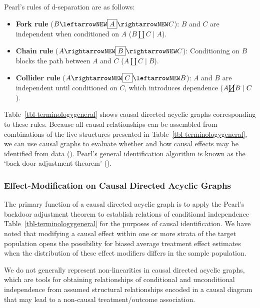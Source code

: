\documentclass[
  single column]{article}
\providecommand{\tightlist}{%
  \setlength{\itemsep}{0pt}\setlength{\parskip}{0pt}}\usepackage{longtable,booktabs,array}
\begin{document}
Pearl's rules of d-separation are as follows:

\begin{itemize}
\tightlist
\item
  \textbf{Fork rule} (\(B \leftarrowNEW \boxed{A} \rightarrowNEW C\)):
  \(B\) and \(C\) are independent when conditioned on \(A\)
  (\(B \coprod C \mid A\)).
\item
  \textbf{Chain rule} (\(A \rightarrowNEW \boxed{B} \rightarrowNEW C\)):
  Conditioning on \(B\) blocks the path between \(A\) and \(C\)
  (\(A \coprod C \mid B\)).
\item
  \textbf{Collider rule}
  (\(A \rightarrowNEW \boxed{C} \leftarrowNEW B\)): \(A\) and \(B\) are
  independent until conditioned on \(C\), which introduces dependence
  (\(A \cancel{\coprod} B \mid C\)).
\end{itemize}

Table~\ref{tbl-terminologygeneral} shows causal directed acyclic graphs
corresponding to these rules. Because all causal relationships can be
assembled from combinations of the five structures presented in
Table~\ref{tbl-terminologygeneral}, we can use causal graphs to evaluate
whether and how causal effects may be identified from data
(). Pearl's general
identification algorithm is known as the `back door adjustment theorem'
().

\subsubsection{Effect-Modification on Causal Directed Acyclic
Graphs}\label{effect-modification-on-causal-directed-acyclic-graphs}

The primary function of a causal directed acyclic graph is to apply the
Pearl's backdoor adjustment theorem to establish relations of
conditional independence Table~\ref{tbl-terminologygeneral} for the
purposes of causal identification. We have noted that modifying a causal
effect within one or more strata of the target population opens the
possibility for biased average treatment effect estimates when the
distribution of these effect modifiers differs in the sample population.

We do not generally represent non-linearities in causal directed acyclic
graphs, which are tools for obtaining relationships of conditional and
unconditional independence from assumed structural relationships encoded
in a causal diagram that may lead to a non-causal treatment/outcome
association.
\end{document}
